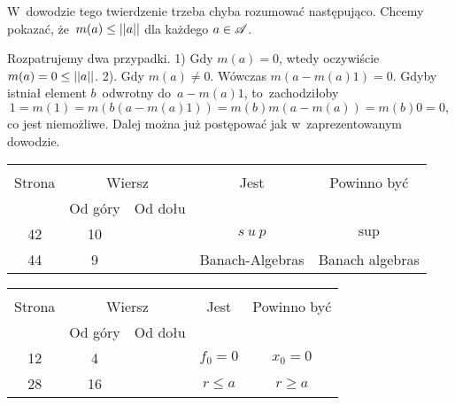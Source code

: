 \documentclass[a4paper,11pt]{article}
\begin{document}
\vspace{\spaceFour}


\start {}  W~dowodzie tego twierdzenie trzeba
chyba rozumować następująco. Chcemy pokazać,
że~$m( a ) \leq \left|\left|  a  \right|\right|$ dla każdego $a \in \mathcal{A}$.

Rozpatrujemy dwa przypadki. 1) Gdy $m( a ) = 0$, wtedy oczywiście
$m( a ) = 0 \leq \left|\left|  a  \right|\right|$. 2). Gdy $m( a ) \neq 0$. Wówczas
$m( a - m( a ) 1 ) = 0$. Gdyby istniał element $b$~odwrotny
do~$a - m( a ) 1$, to~zachodziłoby
\begin{equation*}
  1 = m( 1 ) = m( b ( a - m( a ) 1 ) ) = m( b ) m( a - m( a ) ) = m( b ) 0 = 0,
\end{equation*}
co jest niemożliwe. Dalej można już postępować jak w~zaprezentowanym
dowodzie.


\begin{center}
  \begin{tabular}{|c|c|c|c|c|}
    \hline
    & \multicolumn{2}{c|}{} & & \\
    Strona & \multicolumn{2}{c|}{Wiersz}& Jest & Powinno być \\ \cline{2-3}
    & Od góry & Od dołu &  &  \\ \hline
    42  & 10 & & $s\: u\: p$ & $\sup$ \\
    44  &  9 & & Banach-Algebras & Banach algebras \\
    \hline
  \end{tabular}
\end{center}

\vspace{\spaceTwo}







\begin{center}
  \begin{tabular}{|c|c|c|c|c|}
    \hline
    & \multicolumn{2}{c|}{} & & \\
    Strona & \multicolumn{2}{c|}{Wiersz}& Jest & Powinno być \\ \cline{2-3}
    & Od góry & Od dołu &  &  \\ \hline
    12  &  4 & & $f_{ 0 } = 0$ & $x_{ 0 } = 0$ \\
    28  & 16 & & $r \leq a$ & $r \geq a$ \\
    \hline
  \end{tabular}
\end{center}
\end{document}
